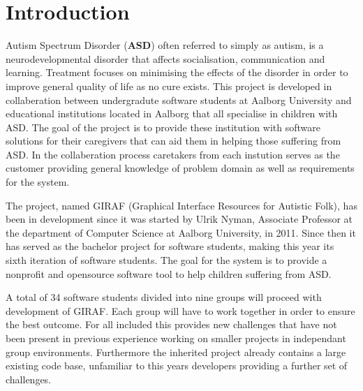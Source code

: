 \chapter{Introduction}
Autism Spectrum Disorder (\textbf{ASD}) often referred to simply as autism, is a 
neurodevelopmental disorder that affects socialisation, communication and learning.
Treatment focuses on minimising the effects of the disorder in order to improve general 
quality of life as no cure exists.
This project is developed in collaberation between undergradute software students at Aalborg 
University and educational institutions located in Aalborg that all specialise in children 
with ASD.
The goal of the project is to provide these institution with software solutions for their 
caregivers that can aid them in helping those suffering from ASD.
In the collaberation process caretakers from each instution serves as the customer providing 
general knowledge of problem domain as well as requirements for the system.

The project, named GIRAF (Graphical Interface Resources for Autistic Folk), has been in 
development since it was started by Ulrik Nyman, Associate Professor at the department of 
Computer Science at Aalborg University, in 2011. 
Since then it has served as the bachelor project for software students, making this year its 
sixth iteration of software students.
The goal for the system is to provide a nonprofit and opensource software tool to help 
children suffering from ASD.

A total of 34 software students divided into nine groups will proceed with development of 
GIRAF.
Each group will have to work together in order to ensure the best outcome.
For all included this provides new challenges that have not been present in previous 
experience working on smaller projects in independant group environments.
Furthermore the inherited project already contains a large existing code base, unfamiliar to 
this years developers providing a further set of challenges.
